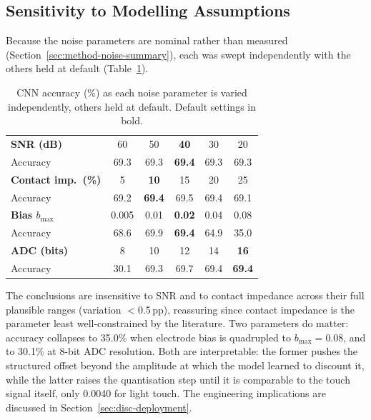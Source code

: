 \subsection{Sensitivity to Modelling Assumptions}
\label{sec:res-sensitivity}

Because the noise parameters are nominal rather than measured (Section~\ref{sec:method-noise-summary}), each was swept independently with the others held at default (Table~\ref{tab:noise-sensitivity}).

\begin{table}[htbp]
\centering
\caption[CNN accuracy under independent noise parameter variation]{CNN accuracy (\%) as each noise parameter is varied independently, others held at default. Default settings in bold.}
\label{tab:noise-sensitivity}
\small
\setlength{\tabcolsep}{5pt}
\begin{tabular}{@{}lccccc@{}}
\toprule
\textbf{SNR (dB)}          & 60 & 50 & \textbf{40} & 30 & 20 \\
\quad Accuracy             & 69.3 & 69.3 & \textbf{69.4} & 69.3 & 69.3 \\
\midrule
\textbf{Contact imp.\ (\%)} & 5 & \textbf{10} & 15 & 20 & 25 \\
\quad Accuracy             & 69.2 & \textbf{69.4} & 69.5 & 69.4 & 69.1 \\
\midrule
\textbf{Bias $b_{\max}$}   & 0.005 & 0.01 & \textbf{0.02} & 0.04 & 0.08 \\
\quad Accuracy             & 68.6 & 69.9 & \textbf{69.4} & 64.9 & 35.0 \\
\midrule
\textbf{ADC (bits)}        & 8 & 10 & 12 & 14 & \textbf{16} \\
\quad Accuracy             & 30.1 & 69.3 & 69.7 & 69.4 & \textbf{69.4} \\
\bottomrule
\end{tabular}
\end{table}

The conclusions are insensitive to SNR and to contact impedance across their full plausible ranges (variation $<$0.5\,pp), reassuring since contact impedance is the parameter least well-constrained by the literature. Two parameters do matter: accuracy collapses to 35.0\% when electrode bias is quadrupled to $b_{\max} = 0.08$, and to 30.1\% at 8-bit ADC resolution. Both are interpretable: the former pushes the structured offset beyond the amplitude at which the model learned to discount it, while the latter raises the quantisation step until it is comparable to the touch signal itself, only 0.0040 for light touch. The engineering implications are discussed in Section~\ref{sec:disc-deployment}.


